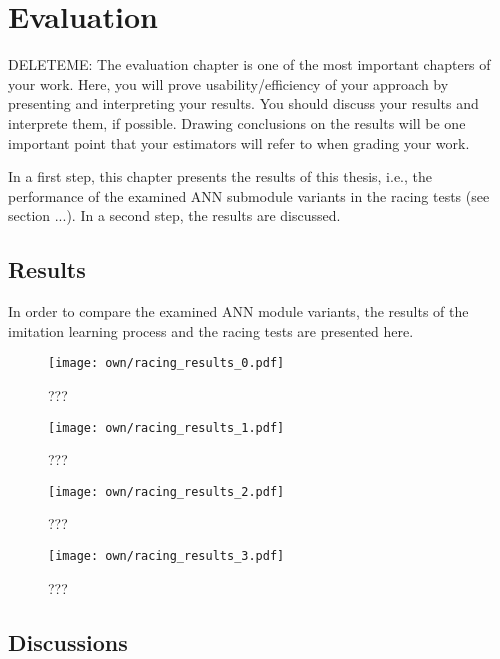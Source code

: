 \chapter{Evaluation}
\label{evaluation}
DELETEME: The evaluation chapter is one of the most important chapters of your work. Here, you will prove usability/efficiency of your approach by presenting and interpreting your results. You should discuss your results and interprete them, if possible. Drawing conclusions on the results will be one important point that your estimators will refer to when grading your work.

In a first step, this chapter presents the results of this thesis,
i.e., the performance of the examined ANN submodule variants
in the racing tests (see section ...).
In a second step, the results are discussed.

\section{Results}
\label{results}
In order to compare the examined ANN module variants,
the results of the imitation learning process
and the racing tests are presented here.




\begin{figure}
    \centering
    \texttt{[image: own/racing\_results\_0.pdf]}
    \caption[
        ???
    ]{
        ???
    \label{fig:?}}
\end{figure}

\begin{figure}
    \centering
    \texttt{[image: own/racing\_results\_1.pdf]}
    \caption[
        ???
    ]{
        ???
    \label{fig:?}}
\end{figure}

\begin{figure}
    \centering
    \texttt{[image: own/racing\_results\_2.pdf]}
    \caption[
        ???
    ]{
        ???
    \label{fig:?}}
\end{figure}

\begin{figure}
    \centering
    \texttt{[image: own/racing\_results\_3.pdf]}
    \caption[
        ???
    ]{
        ???
    \label{fig:?}}
\end{figure}


\section{Discussions}
\label{discussions}